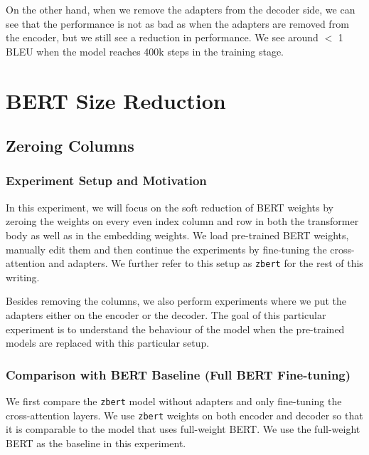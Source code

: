 On the other hand, when we remove the adapters from the decoder side, we can see that the performance is not as bad as when the adapters are removed from the encoder, but we still see a reduction in performance. We see around $<$ 1 BLEU when the model reaches 400k steps in the training stage.

\section{BERT Size Reduction}
\subsection{Zeroing Columns}
\subsubsection{Experiment Setup and Motivation}
In this experiment, we will focus on the soft reduction of BERT weights by zeroing the weights on every even index column and row in both the transformer body as well as in the embedding weights. We load pre-trained BERT weights, manually edit them and then continue the experiments by fine-tuning the cross-attention and adapters. We further refer to this setup as \texttt{zbert} for the rest of this writing.

Besides removing the columns, we also perform experiments where we put the adapters either on the encoder or the decoder. The goal of this particular experiment is to understand the behaviour of the model when the pre-trained models are replaced with this particular setup.

\subsubsection{Comparison with BERT Baseline (Full BERT Fine-tuning)}
We first compare the \texttt{zbert} model without adapters and only fine-tuning the cross-attention layers. We use \texttt{zbert} weights on both encoder and decoder so that it is comparable to the model that uses full-weight BERT. We use the full-weight BERT as the baseline in this experiment.

